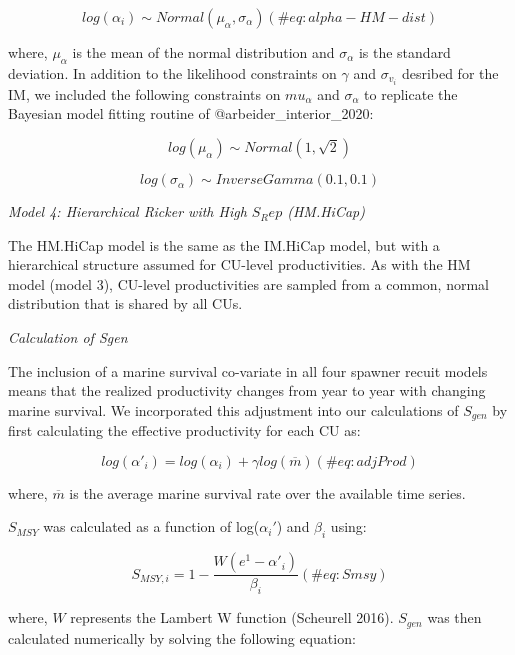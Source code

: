 \documentclass[
]{article}
\begin{document}
\begin{equation}
  log(\alpha_i) \sim Normal(\mu_{\alpha},\sigma_{\alpha})
  (\#eq:alpha-HM-dist)
\end{equation}

where, \(\mu_{\alpha}\) is the mean of the normal distribution and
\(\sigma_{\alpha}\) is the standard deviation. In addition to the
likelihood constraints on \(\gamma\) and \(\sigma_{v_i}\) desribed for
the IM, we included the following constraints on \(mu_{\alpha}\) and
\(\sigma_{\alpha}\) to replicate the Bayesian model fitting routine of
@arbeider\_interior\_2020:

\begin{equation}
  log(\mu_{\alpha}) \sim Normal(1,\sqrt{2})
\end{equation}

\begin{equation}
  log(\sigma_{\alpha}) \sim Inverse Gamma (0.1,0.1)
\end{equation}

\emph{Model 4: Hierarchical Ricker with High \(S_Rep\) (HM.HiCap)}

The HM.HiCap model is the same as the IM.HiCap model, but with a
hierarchical structure assumed for CU-level productivities. As with the
HM model (model 3), CU-level productivities are sampled from a common,
normal distribution that is shared by all CUs.

\emph{Calculation of Sgen}

The inclusion of a marine survival co-variate in all four spawner recuit
models means that the realized productivity changes from year to year
with changing marine survival. We incorporated this adjustment into our
calculations of \(S_{gen}\) by first calculating the effective
productivity for each CU as:

\begin{equation}
  log(\alpha'_{i}) = log(\alpha_i) + \gamma log(\overline{m})
   (\#eq:adjProd)
\end{equation}

where, \(\overline{m}\) is the average marine survival rate over the
available time series.

\(S_{MSY}\) was calculated as a function of log(\(\alpha_i'\)) and
\(\beta_i\) using:

\begin{equation}
  S_{MSY,i} = 1 - \frac{W(e^1-\alpha'_i)}{\beta_i} 
   (\#eq:Smsy)
\end{equation}

where, \(W\) represents the Lambert W function (Scheurell 2016).
\(S_{gen}\) was then calculated numerically by solving the following
equation:
\end{document}
